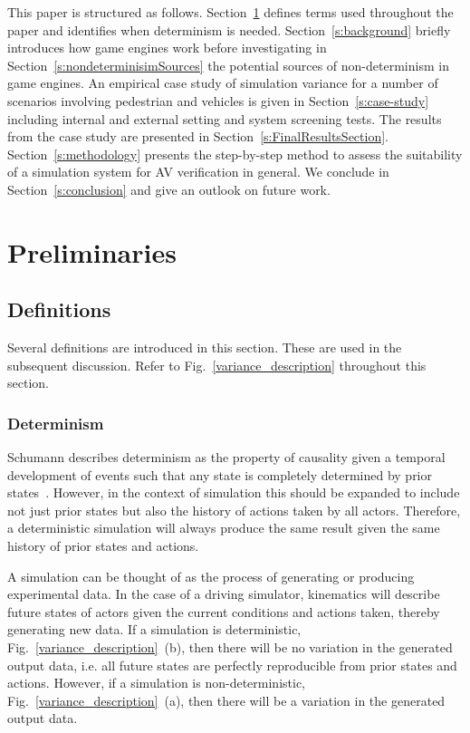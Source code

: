 This paper is structured as follows.
%
Section~\ref{s:prelim} defines terms used throughout the paper and identifies when determinism is needed. 
Section~\ref{s:background} briefly introduces how game engines work before investigating in Section~\ref{s:nondeterminisimSources} the potential sources of non-determinism in game engines.
%
An empirical case study of simulation variance for a number of scenarios involving pedestrian and vehicles is given in Section~\ref{s:case-study} including internal and external setting and system screening tests. 
%
The results from the case study are presented in Section~\ref{s:FinalResultsSection}. 
%
Section~\ref{s:methodology} presents the step-by-step method to assess the suitability of a simulation system for AV verification in general. 
%
We conclude in Section~\ref{s:conclusion} and give an outlook on future work.


\section{Preliminaries} \label{s:prelim}
\subsection{Definitions}
Several definitions are introduced in this section. These are used in the subsequent discussion. Refer to Fig.~\ref{variance_description} throughout this section.
\\

\subsubsection{Determinism}
Schumann describes determinism as the property of causality given a temporal development of events such that any state is completely determined by prior states~\cite{Schumann2010}. However, in the context of simulation this should be expanded to include not just prior states but also the history of actions taken by all actors. Therefore, a deterministic simulation will always produce the same result given the same history of prior states and actions.

A simulation can be thought of as the process of generating or producing experimental data. In the case of a driving simulator, kinematics will describe future states of actors given the current conditions and actions taken, thereby generating new data. If a simulation is deterministic, Fig.~\ref{variance_description}~(b), then there will be no variation in the generated output data, i.e. all future states are perfectly reproducible from prior states and actions. However, if a simulation is non-deterministic, Fig.~\ref{variance_description}~(a), then there will be a variation in the generated output data. \\


